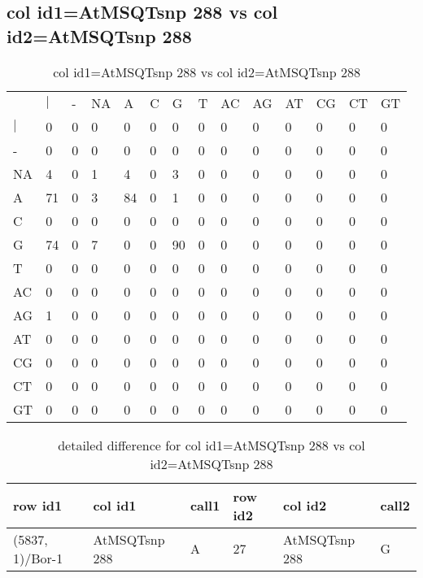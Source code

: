 \subsection{col id1=AtMSQTsnp 288 vs col id2=AtMSQTsnp 288}
\begin{center}
\begin{longtable}{|l|l|l|l|l|l|l|l|l|l|l|l|l|l|}
\caption{col id1=AtMSQTsnp 288 vs col id2=AtMSQTsnp 288} \label{table_dm830}\\
\hline
\\
\hline
&$|$&-&NA&A&C&G&T&AC&AG&AT&CG&CT&GT\\
$|$&0&0&0&0&0&0&0&0&0&0&0&0&0\\
-&0&0&0&0&0&0&0&0&0&0&0&0&0\\
NA&4&0&1&4&0&3&0&0&0&0&0&0&0\\
A&71&0&3&84&0&1&0&0&0&0&0&0&0\\
C&0&0&0&0&0&0&0&0&0&0&0&0&0\\
G&74&0&7&0&0&90&0&0&0&0&0&0&0\\
T&0&0&0&0&0&0&0&0&0&0&0&0&0\\
AC&0&0&0&0&0&0&0&0&0&0&0&0&0\\
AG&1&0&0&0&0&0&0&0&0&0&0&0&0\\
AT&0&0&0&0&0&0&0&0&0&0&0&0&0\\
CG&0&0&0&0&0&0&0&0&0&0&0&0&0\\
CT&0&0&0&0&0&0&0&0&0&0&0&0&0\\
GT&0&0&0&0&0&0&0&0&0&0&0&0&0\\
\hline
\end{longtable}
\end{center}

\begin{center}
\begin{longtable}{|l|l|l|l|l|l|}
\caption{detailed difference for col id1=AtMSQTsnp 288 vs col id2=AtMSQTsnp 288} \label{table_dm831}\\
\hline
row id1&col id1&call1&row id2&col id2&call2\\
\hline
(5837, 1)/Bor-1&AtMSQTsnp 288&A&27&AtMSQTsnp 288&G\\
\hline
\end{longtable}
\end{center}

